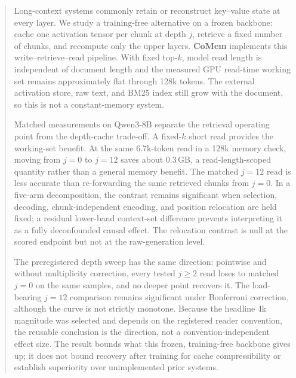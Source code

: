 \begin{abstract}
Long-context systems commonly retain or reconstruct key--value state at every
layer.  We study a training-free alternative on a frozen backbone: cache one
activation tensor per chunk at depth $j$, retrieve a fixed number of chunks, and
recompute only the upper layers.  \textbf{CoMem} implements this
write--retrieve--read pipeline.  With fixed top-$k$, model read length is
independent of document length and the measured GPU read-time working set remains
approximately flat through 128k tokens.  The external activation store, raw text,
and BM25 index still grow with the document, so this is not a constant-memory
system.

Matched measurements on Qwen3-8B separate the retrieval operating point from the
depth-cache trade-off.  A fixed-$k$ short read provides the working-set benefit.
At the same 6.7k-token read in a 128k memory check, moving from $j{=}0$ to
$j{=}12$ saves about 0.3\,GB, a read-length-scoped quantity rather than a general
memory benefit.  The matched $j{=}12$ read is less accurate than re-forwarding the
same retrieved chunks from $j{=}0$.  In a five-arm decomposition, the contrast
remains significant when selection, decoding, chunk-independent encoding, and
position relocation are held fixed; a residual lower-band context-set difference
prevents interpreting it as a fully deconfounded causal effect.  The relocation
contrast is null at the scored endpoint but not at the raw-generation level.

The preregistered depth sweep has the same direction: pointwise and without
multiplicity correction, every tested $j{\ge}2$ read loses to matched $j{=}0$ on
the same samples, and no deeper point recovers it.  The load-bearing $j{=}12$
comparison remains significant under Bonferroni correction, although the curve is
not strictly monotone.  Because the headline 4k magnitude was selected and depends
on the registered reader convention, the reusable conclusion is the direction,
not a convention-independent effect size.  The result bounds what this frozen,
training-free backbone gives up; it does not bound recovery after training for
cache compressibility or establish superiority over unimplemented prior systems.
\end{abstract}
